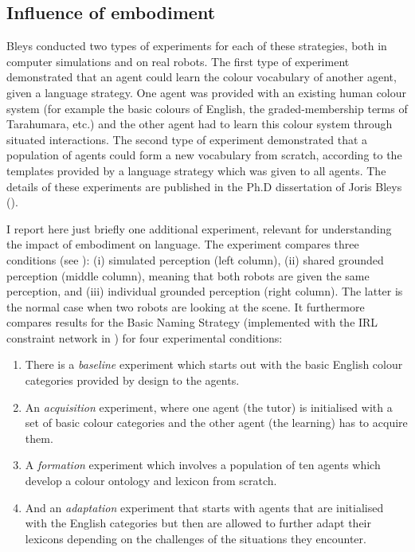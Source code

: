 \subsection{Influence of embodiment}

Bleys conducted two types of experiments for each of these strategies, both in computer simulations and on 
real robots. The first type of experiment demonstrated that an agent could learn the colour vocabulary of another agent, 
given a language strategy. One agent was provided with an existing human colour system (for example the basic colours 
of English, the graded-membership terms of Tarahumara, etc.) and the other agent had to learn this colour system through
situated interactions. The second type of experiment demonstrated that a population of agents could form a new 
vocabulary from scratch, according to the templates provided by a language strategy which was given to all agents. 
The details of these experiments are published in the Ph.D dissertation of Joris Bleys (\cite{Bleys:2014}). 

I report here just briefly one additional experiment, relevant for understanding 
the impact of embodiment on language. The experiment compares three conditions (see ): 
(i) simulated perception (left column), (ii) shared grounded perception (middle column), meaning that both robots 
are given the same perception, and (iii) individual grounded 
perception (right column). The latter is the normal case when two robots are looking at the scene. 
It furthermore compares results for the Basic Naming Strategy (implemented with the IRL constraint network in 
) for four experimental conditions: 
\begin{enumerate}
\item There is a {\itshape baseline} experiment which starts out with the basic English colour categories provided 
by design to the agents. 
\item An {\itshape acquisition} experiment, where one agent (the tutor) is initialised with a set of basic colour categories and 
the other agent (the learning) has to acquire them. 
\item A {\itshape formation} experiment which involves a population of ten agents which develop a 
colour ontology and lexicon from scratch. 
\item And an {\itshape adaptation} experiment that starts with agents that are initialised with the 
English categories but then are allowed to further adapt their lexicons depending on the challenges of the situations 
they encounter. 
\end{enumerate}

